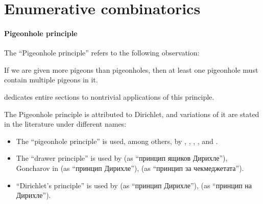 \section{Enumerative combinatorics}\label{sec:enumerative_combinatorics}

\paragraph{Pigeonhole principle}

\begin{concept}\label{con:pigeonhole_principle}
  The \enquote{Pigeonhole principle} refers to the following observation:
  \begin{displayquote}
    If we are given more pigeons than pigeonholes, then at least one pigeonhole must contain multiple pigeons in it.
  \end{displayquote}

   dedicates entire sections to nontrivial applications of this principle.

  The Pigeonhole principle is attributed to Dirichlet, and variations of it are stated in the literature under different names:
  \begin{itemize}
    \item The \enquote{pigeonhole principle} is used, among others, by , , , ,  and .
    \item The \enquote{drawer principle} is used by  (as \enquote{принцип ящиков Дирихле}), Goncharov in \cite[156]{АлександровМаркушевичХинчин1952ЭнциклопедияТом3} (as \enquote{принцип Дирихле}),  (as \enquote{принцип за чекмеджетата}).
    \item \enquote{Dirichlet's principle} is used by  (as \enquote{принцип Дирихле}),  (as \enquote{принцип на Дирихле}).
  \end{itemize}
\end{concept}

